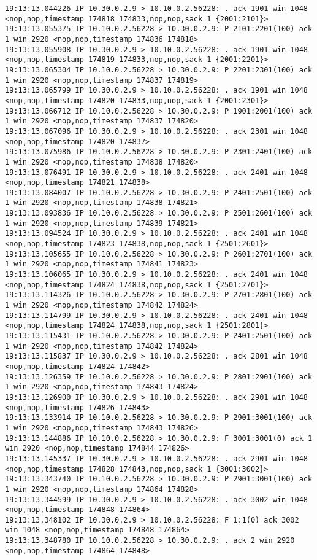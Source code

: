 \documentclass[a4paper,12pt]{article}
\begin{document}
\begin{lstlisting}
19:13:13.044226 IP 10.30.0.2.9 > 10.10.0.2.56228: . ack 1901 win 1048 <nop,nop,timestamp 174818 174833,nop,nop,sack 1 {2001:2101}>
19:13:13.055375 IP 10.10.0.2.56228 > 10.30.0.2.9: P 2101:2201(100) ack 1 win 2920 <nop,nop,timestamp 174836 174818>
19:13:13.055908 IP 10.30.0.2.9 > 10.10.0.2.56228: . ack 1901 win 1048 <nop,nop,timestamp 174819 174833,nop,nop,sack 1 {2001:2201}>
19:13:13.065304 IP 10.10.0.2.56228 > 10.30.0.2.9: P 2201:2301(100) ack 1 win 2920 <nop,nop,timestamp 174837 174819>
19:13:13.065799 IP 10.30.0.2.9 > 10.10.0.2.56228: . ack 1901 win 1048 <nop,nop,timestamp 174820 174833,nop,nop,sack 1 {2001:2301}>
19:13:13.066712 IP 10.10.0.2.56228 > 10.30.0.2.9: P 1901:2001(100) ack 1 win 2920 <nop,nop,timestamp 174837 174820>
19:13:13.067096 IP 10.30.0.2.9 > 10.10.0.2.56228: . ack 2301 win 1048 <nop,nop,timestamp 174820 174837>
19:13:13.075986 IP 10.10.0.2.56228 > 10.30.0.2.9: P 2301:2401(100) ack 1 win 2920 <nop,nop,timestamp 174838 174820>
19:13:13.076491 IP 10.30.0.2.9 > 10.10.0.2.56228: . ack 2401 win 1048 <nop,nop,timestamp 174821 174838>
19:13:13.084007 IP 10.10.0.2.56228 > 10.30.0.2.9: P 2401:2501(100) ack 1 win 2920 <nop,nop,timestamp 174838 174821>
19:13:13.093836 IP 10.10.0.2.56228 > 10.30.0.2.9: P 2501:2601(100) ack 1 win 2920 <nop,nop,timestamp 174839 174821>
19:13:13.094524 IP 10.30.0.2.9 > 10.10.0.2.56228: . ack 2401 win 1048 <nop,nop,timestamp 174823 174838,nop,nop,sack 1 {2501:2601}>
19:13:13.105655 IP 10.10.0.2.56228 > 10.30.0.2.9: P 2601:2701(100) ack 1 win 2920 <nop,nop,timestamp 174841 174823>
19:13:13.106065 IP 10.30.0.2.9 > 10.10.0.2.56228: . ack 2401 win 1048 <nop,nop,timestamp 174824 174838,nop,nop,sack 1 {2501:2701}>
19:13:13.114326 IP 10.10.0.2.56228 > 10.30.0.2.9: P 2701:2801(100) ack 1 win 2920 <nop,nop,timestamp 174842 174824>
19:13:13.114799 IP 10.30.0.2.9 > 10.10.0.2.56228: . ack 2401 win 1048 <nop,nop,timestamp 174824 174838,nop,nop,sack 1 {2501:2801}>
19:13:13.115431 IP 10.10.0.2.56228 > 10.30.0.2.9: P 2401:2501(100) ack 1 win 2920 <nop,nop,timestamp 174842 174824>
19:13:13.115837 IP 10.30.0.2.9 > 10.10.0.2.56228: . ack 2801 win 1048 <nop,nop,timestamp 174824 174842>
19:13:13.126359 IP 10.10.0.2.56228 > 10.30.0.2.9: P 2801:2901(100) ack 1 win 2920 <nop,nop,timestamp 174843 174824>
19:13:13.126900 IP 10.30.0.2.9 > 10.10.0.2.56228: . ack 2901 win 1048 <nop,nop,timestamp 174826 174843>
19:13:13.133914 IP 10.10.0.2.56228 > 10.30.0.2.9: P 2901:3001(100) ack 1 win 2920 <nop,nop,timestamp 174843 174826>
19:13:13.144886 IP 10.10.0.2.56228 > 10.30.0.2.9: F 3001:3001(0) ack 1 win 2920 <nop,nop,timestamp 174844 174826>
19:13:13.145337 IP 10.30.0.2.9 > 10.10.0.2.56228: . ack 2901 win 1048 <nop,nop,timestamp 174828 174843,nop,nop,sack 1 {3001:3002}>
19:13:13.343740 IP 10.10.0.2.56228 > 10.30.0.2.9: P 2901:3001(100) ack 1 win 2920 <nop,nop,timestamp 174864 174828>
19:13:13.344599 IP 10.30.0.2.9 > 10.10.0.2.56228: . ack 3002 win 1048 <nop,nop,timestamp 174848 174864>
19:13:13.348102 IP 10.30.0.2.9 > 10.10.0.2.56228: F 1:1(0) ack 3002 win 1048 <nop,nop,timestamp 174848 174864>
19:13:13.348780 IP 10.10.0.2.56228 > 10.30.0.2.9: . ack 2 win 2920 <nop,nop,timestamp 174864 174848>
\end{lstlisting}
\end{document}
